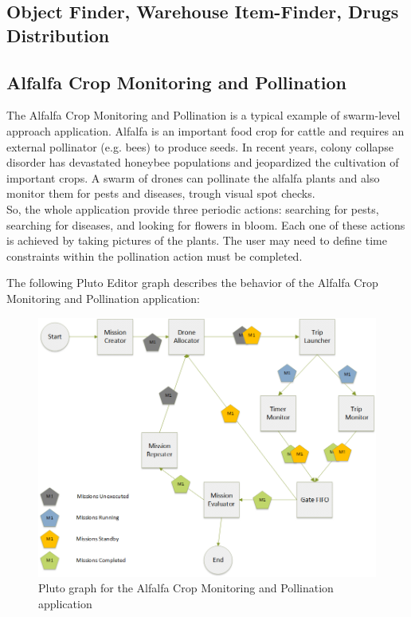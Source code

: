 \subsection{Object Finder, Warehouse Item-Finder, Drugs Distribution}



\subsection{Alfalfa Crop Monitoring and Pollination}\label{alfalfa}

The Alfalfa Crop Monitoring and Pollination\cite{alfalfa} is a typical example of swarm-level approach application.
Alfalfa is an important food crop for cattle and requires an external pollinator (e.g. bees) to produce seeds. In recent years, colony collapse disorder has devastated honeybee populations and jeopardized the cultivation of important crops\cite{colony}.
A swarm of drones can pollinate the alfalfa plants and also monitor them for pests and diseases, trough visual spot checks.
\\
So, the whole application provide three periodic actions: searching for pests, searching for diseases, and looking for flowers in bloom.
Each one of these actions is achieved by taking pictures of the plants.
The user may need to define time constraints within the pollination action must be completed.

The following Pluto Editor graph describes the behavior of the Alfalfa Crop Monitoring and Pollination\cite{alfalfa} application:

\begin{figure}[H]
  \centering
  \includegraphics[width=\linewidth]{pictures/Alfalfa_Diagram.png}
  \caption{Pluto graph for the Alfalfa Crop Monitoring and Pollination application}
  \label{fig:alfalfaGraph}
\end{figure}

